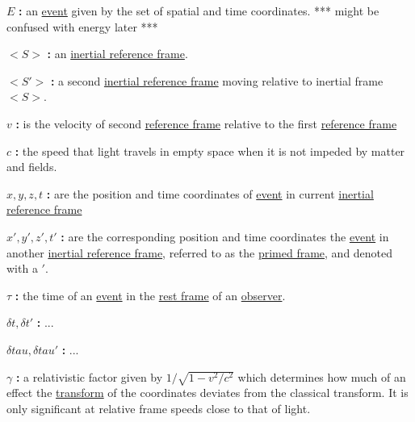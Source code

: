 \noindent \hypertarget{math-E}{$E$ \textbf{:}}
an \hyperlink{def-event}{event} given by the set of spatial and time coordinates. *** might be confused with energy later *** 

\noindent \hypertarget{math-S}{$<S>$ \textbf{:}}   
an \hyperlink{def-Inertial-reference-frame}{inertial reference frame}.

\noindent \hypertarget{math-Sprime}{$<S'>$ \textbf{:}}   
a second \hyperlink{def-Inertial-reference-frame}{inertial reference frame} moving relative to inertial frame $<S>$. 

\noindent \hypertarget{math-v}{$v$ \textbf{:}}  
is the velocity of second \hyperlink{def-Reference-frame}{reference frame} relative to the first \hyperlink{def-Reference-frame}{reference frame}

\noindent \hypertarget{math-c}{$c$ \textbf{:}}
the speed that light travels in empty space when it is not impeded by matter and fields. 

\noindent \hypertarget{math-coords}{$x,y,z,t$ \textbf{:}}   
are the position and time coordinates of \hyperlink{def-event}{event} in current \hyperlink{def-Inertial-reference-frame}{inertial reference frame} 

\noindent \hypertarget{math-coords-prime}{$x',y',z',t'$ \textbf{:}}   
are the corresponding position and time coordinates the \hyperlink{def-event}{event} in another \hyperlink{def-Inertial-reference-frame}{inertial reference frame}, referred to as the \hyperlink{def-Primed-Frame}{primed frame}, and denoted with a $'$.

\noindent \hypertarget{math-tau}{$\tau$ \textbf{:}}   
the time of an \hyperlink{def-event}{event} in the \hyperlink{def-proper-frame}{rest frame} of an \hyperlink{def-observer}{observer}. 

\noindent \hypertarget{math-delta-t,delta-t-prime}{$\delta t,\delta t'$ \textbf{:}}
...

\noindent \hypertarget{math-delta-tau,delta-tau-prime}{$\delta tau,\delta tau'$ \textbf{:}}   
...

\noindent \hypertarget{math-gamma}{$\gamma$ \textbf{:}}  
a relativistic factor given by $1/\sqrt{1-v^2/c^2}$ which determines how much of an effect the \hyperlink{def-transform}{transform} of the coordinates deviates from the classical transform. It is only significant at relative frame speeds close to that of light. 

